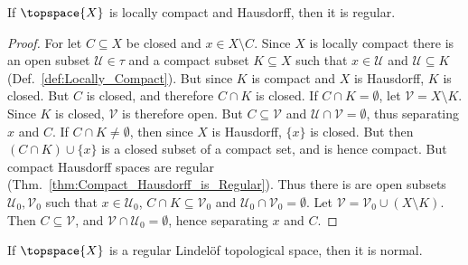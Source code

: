 \documentclass{article}                                                        %
\begin{document}
            \begin{theorem}
                \label{thm:Loc_Comp_and_Hausdorff_is_Regular}%
                If $\topspace{X}$ is locally compact and Hausdorff, then it is
                regular.
            \end{theorem}
            \begin{proof}
                For let $C\subseteq{X}$ be closed and $x\in{X}\setminus{C}$. Since
                $X$ is locally compact there is an open subset
                $\mathcal{U}\in\tau$ and a compact subset $K\subseteq{X}$ such that
                $x\in\mathcal{U}$ and $\mathcal{U}\subseteq{K}$
                (Def.~\ref{def:Locally_Compact}). But since $K$ is compact and $X$
                is Hausdorff, $K$ is closed. But $C$ is closed, and therefore
                $C\cap{K}$ is closed. If $C\cap{K}=\emptyset$, let
                $\mathcal{V}=X\setminus{K}$. Since $K$ is closed,  $\mathcal{V}$ is
                therefore open. But $C\subseteq\mathcal{V}$ and
                $\mathcal{U}\cap\mathcal{V}=\emptyset$, thus separating $x$ and $C$.
                If $C\cap{K}\ne\emptyset$, then since $X$ is Hausdorff, $\{x\}$ is
                closed. But then $(C\cap{K})\cup\{x\}$ is a closed subset of a
                compact set, and is hence compact. But compact Hausdorff spaces are
                regular (Thm.~\ref{thm:Compact_Hausdorff_is_Regular}). Thus there is
                are open subsets $\mathcal{U}_{0},\mathcal{V}_{0}$ such that
                $x\in\mathcal{U}_{0}$, $C\cap{K}\subseteq\mathcal{V}_{0}$ and
                $\mathcal{U}_{0}\cap\mathcal{V}_{0}=\emptyset$.
                Let $\mathcal{V}=\mathcal{V}_{0}\cup(X\setminus{K})$. Then
                $C\subseteq\mathcal{V}$, and
                $\mathcal{V}\cap\mathcal{U}_{0}=\emptyset$, hence separating
                $x$ and $C$.
            \end{proof}
            \begin{theorem}
                \label{thm:Regular_Lindelof_is_Normal}%
                If $\topspace{X}$ is a regular Lindel\"{o}f topological space,
                then it is normal.
            \end{theorem}
\end{document}
